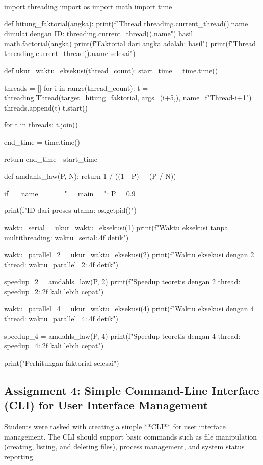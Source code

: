 \documentclass[12pt]{article}
\begin{document}
	\begin{python}
		
		import threading
		import os
		import math
		import time
		
		def hitung_faktorial(angka):
		print(f"Thread {threading.current_thread().name} dimulai dengan ID: {threading.current_thread().name}")
		hasil = math.factorial(angka)
		print(f"Faktorial dari {angka} adalah: {hasil}")
		print(f"Thread {threading.current_thread().name} selesai")
		
		def ukur_waktu_eksekusi(thread_count):
		start_time = time.time()
		
		threads = []
		for i in range(thread_count):
		t = threading.Thread(target=hitung_faktorial, args=(i+5,), name=f"Thread-{i+1}")
		threads.append(t)
		t.start()
		
		for t in threads:
		t.join()
		
		end_time = time.time()
		
		return end_time - start_time
		
		def amdahls_law(P, N):
		return 1 / ((1 - P) + (P / N))
		
		if __name__ == "__main__":
		P = 0.9  
		
		print(f"ID dari proses utama: {os.getpid()}")
		
		waktu_serial = ukur_waktu_eksekusi(1)
		print(f"Waktu eksekusi tanpa multithreading: {waktu_serial:.4f} detik")
		
		waktu_parallel_2 = ukur_waktu_eksekusi(2)
		print(f"Waktu eksekusi dengan 2 thread: {waktu_parallel_2:.4f} detik")
		
		speedup_2 = amdahls_law(P, 2)
		print(f"Speedup teoretis dengan 2 thread: {speedup_2:.2f} kali lebih cepat")
		
		waktu_parallel_4 = ukur_waktu_eksekusi(4)
		print(f"Waktu eksekusi dengan 4 thread: {waktu_parallel_4:.4f} detik")
		
		speedup_4 = amdahls_law(P, 4)
		print(f"Speedup teoretis dengan 4 thread: {speedup_4:.2f} kali lebih cepat")
		
		print("Perhitungan faktorial selesai")
		
	\end{python}
	
	
	
	\subsection{Assignment 4: Simple Command-Line Interface (CLI) for User Interface Management}
	Students were tasked with creating a simple **CLI** for user interface management. The CLI should support basic commands such as file manipulation (creating, listing, and deleting files), process management, and system status reporting.
	
\end{document}

